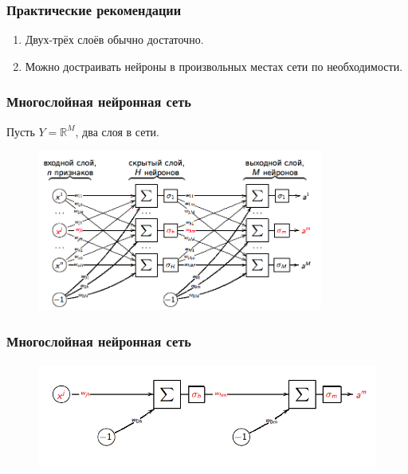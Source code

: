 \documentclass[10pt]{beamer}
\begin{document}
\begin{frame}\frametitle{Практические рекомендации}
	\begin{enumerate}[--]
    	\item Двух-трёх слоёв обычно достаточно.
	  \item Можно достраивать нейроны в произвольных местах сети по необходимости.
	\end{enumerate}
\end{frame}

\begin{frame}\frametitle{Многослойная нейронная сеть}
	Пусть $Y = \mathbb{R}^M$, два слоя в сети.\\
	
	\begin{figure}[htbp]
	  \includegraphics[height=150pt, keepaspectratio = true]{images/neural_network}   
	\end{figure}
\end{frame}

\begin{frame}\frametitle{Многослойная нейронная сеть}
	\begin{figure}[htbp]
	  \includegraphics[height=100pt, keepaspectratio = true]{images/neural_network1}   
	\end{figure}
\end{frame}
\end{document}
